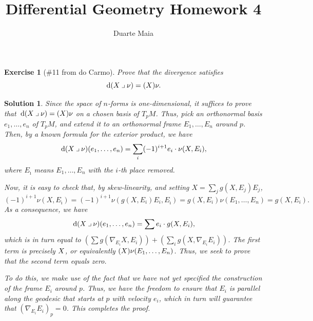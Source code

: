 \documentclass{article}
\title{Differential Geometry Homework 4}
\author{Duarte Maia}
\theoremstyle{plain}
\newtheorem*{ex}{Exercise}
\theoremstyle{nonumberplain}
\newtheorem{sol}{Solution}
\newcommand{\into}{\mathbin{\lrcorner}}
\let\div\relax
\DeclareMathOperator{\div}{div}
\begin{document}
\maketitle

\begin{ex}[\#11 from do Carmo]
Prove that the divergence satisfies
\begin{equation}
\dl(X \into \nu) = (\div X) \nu.
\end{equation}
\end{ex}

\begin{sol}
Since the space of $n$-forms is one-dimensional, it suffices to prove that $\dl(X \into \nu) = (\div X) \nu$ on a chosen basis of $T_p M$. Thus, pick an orthonormal basis $e_1, \dots, e_n$ of $T_p M$, and extend it to an orthonormal frame $E_1, \dots, E_n$ around $p$. Then, by a known formula for the exterior product, we have
\begin{equation}
\dl(X \into \nu)(e_1, \dots, e_n) = \sum_i (-1)^{i+1} e_i \cdot \nu(X, E_{\hat\imath}),
\end{equation}
where $E_{\hat\imath}$ means $E_1, \dots, E_n$ with the $i$-th place removed.

Now, it is easy to check that, by skew-linearity, and setting $X = \sum_j g(X, E_j) E_j$,
\begin{equation}
(-1)^{i+1} \nu(X, E_{\hat\imath}) = (-1)^{i+1} \nu(g(X, E_i) E_i, E_{\hat\imath}) = g(X,E_i) \nu(E_1,\dots,E_n) = g(X,E_i).
\end{equation}
As a consequence, we have
\begin{equation}
\dl(X \into \nu)(e_1, \dots, e_n) = \sum e_i \cdot g(X,E_i),
\end{equation}
which is in turn equal to $\left(\sum g(\nabla_{E_i} X, E_i)\right) + \left( \sum_i g(X, \nabla_{E_i} E_i) \right)$. The first term is precisely $\div X$, or equivalently $(\div X) \nu(E_1, \dots, E_n)$. Thus, we seek to prove that the second term equals zero.

To do this, we make use of the fact that we have not yet specified the construction of the frame $E_i$ around $p$. Thus, we have the freedom to ensure that $E_i$ is parallel along the geodesic that starts at $p$ with velocity $e_i$, which in turn will guarantee that $(\nabla_{E_i} E_i)_p = 0$. This completes the proof.
\end{sol}

\pagebreak
\end{document}

